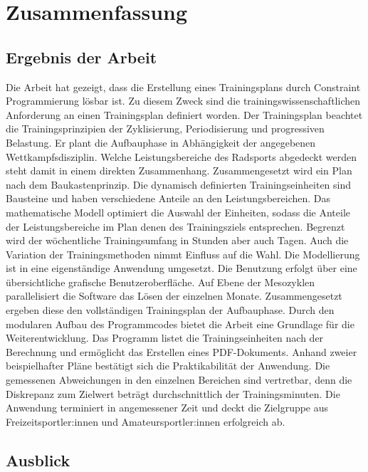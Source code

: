 \chapter{Zusammenfassung}
\label{sec:zusammenfassung}
\section{Ergebnis der Arbeit}
\label{sec:zusammenfassung:ergebnis}
Die Arbeit hat gezeigt, dass die Erstellung eines Trainingsplans durch Constraint Programmierung lösbar ist. Zu diesem Zweck sind die trainingswissenschaftlichen Anforderung an einen Trainingsplan definiert worden. Der Trainingsplan beachtet die Trainingsprinzipien der Zyklisierung, Periodisierung und progressiven Belastung. Er plant die Aufbauphase in Abhängigkeit der angegebenen Wettkampfsdisziplin. Welche Leistungsbereiche des Radsports abgedeckt werden steht damit in einem direkten Zusammenhang.\newline 
Zusammengesetzt wird ein Plan nach dem Baukastenprinzip. Die dynamisch definierten Trainingseinheiten sind Bausteine und haben verschiedene Anteile an den Leistungsbereichen. Das mathematische Modell optimiert die Auswahl der Einheiten, sodass die Anteile der Leistungsbereiche im Plan denen des Trainingsziels entsprechen. Begrenzt wird der wöchentliche Trainingsumfang in Stunden aber auch Tagen. Auch die Variation der Trainingsmethoden nimmt Einfluss auf die Wahl.\newline
Die Modellierung ist in eine eigenständige Anwendung umgesetzt. Die Benutzung erfolgt über eine übersichtliche grafische Benutzeroberfläche. Auf Ebene der Mesozyklen parallelisiert die Software das Lösen der einzelnen Monate. Zusammengesetzt ergeben diese den vollständigen Trainingsplan der Aufbauphase. Durch den modularen Aufbau des Programmcodes bietet die Arbeit eine Grundlage für die Weiterentwicklung. Das Programm listet die Trainingseinheiten nach der Berechnung und ermöglicht das Erstellen eines PDF-Dokuments.\newline
Anhand zweier beispielhafter Pläne bestätigt sich die Praktikabilität der Anwendung. Die gemessenen Abweichungen in den einzelnen Bereichen sind vertretbar, denn die Diskrepanz zum Zielwert beträgt durchschnittlich  der Trainingsminuten. Die Anwendung terminiert in angemessener Zeit und deckt die Zielgruppe aus Freizeitsportler:innen und Amateursportler:innen erfolgreich ab.

\section{Ausblick}
\label{sec:zusammenfassung:ausblick}

